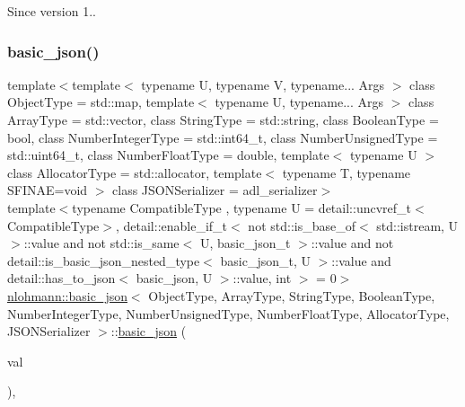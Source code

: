 \begin{DoxySince}{Since}
version 1.. 
\end{DoxySince}
\mbox{\label{classnlohmann_1_1basic__json_a7639e0834df2bc719a04ffea89b31abc}} 
\subsubsection{\texorpdfstring{basic\_json()}{basic\_json()}\hspace{0.1cm}{\footnotesize\ttfamily [3/9]}}
{\footnotesize\ttfamily template$<$template$<$ typename U, typename V, typename... Args $>$ class Object\+Type = std\+::map, template$<$ typename U, typename... Args $>$ class Array\+Type = std\+::vector, class String\+Type  = std\+::string, class Boolean\+Type  = bool, class Number\+Integer\+Type  = std\+::int64\+\_\+t, class Number\+Unsigned\+Type  = std\+::uint64\+\_\+t, class Number\+Float\+Type  = double, template$<$ typename U $>$ class Allocator\+Type = std\+::allocator, template$<$ typename T, typename S\+F\+I\+N\+A\+E=void $>$ class J\+S\+O\+N\+Serializer = adl\+\_\+serializer$>$ \\
template$<$typename Compatible\+Type , typename U  = detail\+::uncvref\+\_\+t$<$\+Compatible\+Type$>$, detail\+::enable\+\_\+if\+\_\+t$<$ not std\+::is\+\_\+base\+\_\+of$<$ std\+::istream, U $>$\+::value and not std\+::is\+\_\+same$<$ U, basic\+\_\+json\+\_\+t $>$\+::value and not detail\+::is\+\_\+basic\+\_\+json\+\_\+nested\+\_\+type$<$ basic\+\_\+json\+\_\+t, U $>$\+::value and detail\+::has\+\_\+to\+\_\+json$<$ basic\+\_\+json, U $>$\+::value, int $>$  = 0$>$ \\
\mbox{\hyperlink{classnlohmann_1_1basic__json}{nlohmann\+::basic\+\_\+json}}$<$ Object\+Type, Array\+Type, String\+Type, Boolean\+Type, Number\+Integer\+Type, Number\+Unsigned\+Type, Number\+Float\+Type, Allocator\+Type, J\+S\+O\+N\+Serializer $>$\+::\mbox{\hyperlink{classnlohmann_1_1basic__json}{basic\+\_\+json}} (\begin{DoxyParamCaption}\item[{Compatible\+Type \&\&}]{val }\end{DoxyParamCaption})\hspace{0.3cm}{\ttfamily [inline]}, {\ttfamily [noexcept]}}



